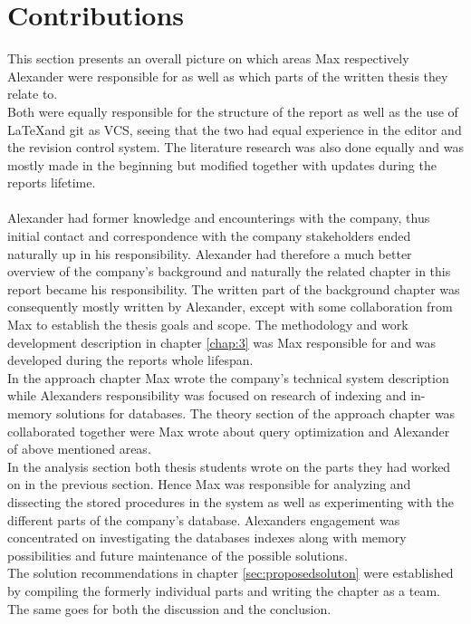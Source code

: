 \documentclass{cslthse-msc}
\begin{document}
\section{Contributions}
This section presents an overall picture on which areas Max respectively Alexander were responsible for as well as which parts of the written thesis they relate to.\\
Both were equally responsible for the structure of the report as well as the use of \LaTeX and git as VCS, seeing that the two had equal experience in the editor and the revision control system. The literature research was also done equally and was mostly made in the beginning but modified together with updates during the reports lifetime.\\\\
Alexander had former knowledge and encounterings with the company, thus initial contact and correspondence
with the company stakeholders ended naturally up in his responsibility. Alexander had therefore a much better overview of the company's background and naturally the related chapter in this report became his responsibility. The written part of the background chapter was consequently mostly written by Alexander, except with some collaboration from Max to establish the thesis goals and scope. The methodology and work development description in chapter \ref{chap:3} was Max responsible for and was developed during the reports whole lifespan.\\
In the approach chapter Max wrote the company's technical system description while Alexanders responsibility was focused on research of indexing and in-memory solutions for databases. The theory section of the approach chapter was collaborated together were Max wrote about query optimization and Alexander of above mentioned areas.\\
In the analysis section both thesis students wrote on the parts they had worked on in the previous section. Hence Max was responsible for analyzing and dissecting the stored procedures in the system as well as experimenting with the different parts of the company's database. Alexanders engagement was concentrated on investigating the databases indexes along with memory possibilities and future maintenance of the possible solutions.\\           
The solution recommendations in chapter \ref{sec:proposedsoluton} were established by compiling the formerly individual parts and writing the chapter as a team. The same goes for both the discussion and the conclusion. 
      
\end{document}
